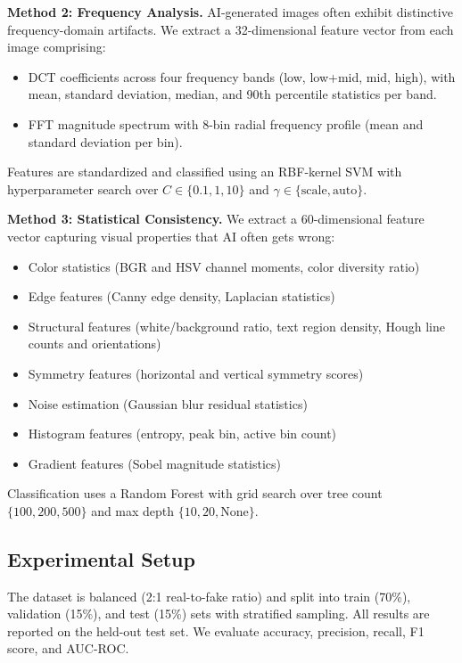 \documentclass[11pt]{article}
\begin{document}
\textbf{Method 2: Frequency Analysis.} AI-generated images often exhibit distinctive frequency-domain artifacts. We extract a 32-dimensional feature vector from each image comprising:
\begin{itemize}
    \item DCT coefficients across four frequency bands (low, low+mid, mid, high), with mean, standard deviation, median, and 90th percentile statistics per band.
    \item FFT magnitude spectrum with 8-bin radial frequency profile (mean and standard deviation per bin).
\end{itemize}
Features are standardized and classified using an RBF-kernel SVM with hyperparameter search over $C \in \{0.1, 1, 10\}$ and $\gamma \in \{\text{scale}, \text{auto}\}$.

\textbf{Method 3: Statistical Consistency.} We extract a 60-dimensional feature vector capturing visual properties that AI often gets wrong:
\begin{itemize}
    \item Color statistics (BGR and HSV channel moments, color diversity ratio)
    \item Edge features (Canny edge density, Laplacian statistics)
    \item Structural features (white/background ratio, text region density, Hough line counts and orientations)
    \item Symmetry features (horizontal and vertical symmetry scores)
    \item Noise estimation (Gaussian blur residual statistics)
    \item Histogram features (entropy, peak bin, active bin count)
    \item Gradient features (Sobel magnitude statistics)
\end{itemize}
Classification uses a Random Forest with grid search over tree count $\{100, 200, 500\}$ and max depth $\{10, 20, \text{None}\}$.

\subsection{Experimental Setup}

The dataset is balanced (2:1 real-to-fake ratio) and split into train (70\%), validation (15\%), and test (15\%) sets with stratified sampling. All results are reported on the held-out test set. We evaluate accuracy, precision, recall, F1 score, and AUC-ROC.
\end{document}
